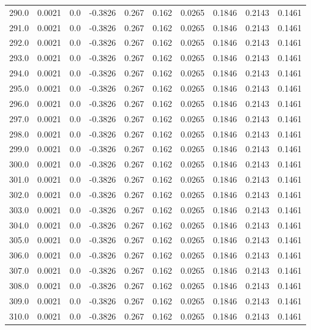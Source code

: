 \begin{longtable}{lrrrrrrrrr}
290.0 & 0.0021 & 0.0 & -0.3826 & 0.267 & 0.162 & 0.0265 & 0.1846 & 0.2143 & 0.1461 \\
291.0 & 0.0021 & 0.0 & -0.3826 & 0.267 & 0.162 & 0.0265 & 0.1846 & 0.2143 & 0.1461 \\
292.0 & 0.0021 & 0.0 & -0.3826 & 0.267 & 0.162 & 0.0265 & 0.1846 & 0.2143 & 0.1461 \\
293.0 & 0.0021 & 0.0 & -0.3826 & 0.267 & 0.162 & 0.0265 & 0.1846 & 0.2143 & 0.1461 \\
294.0 & 0.0021 & 0.0 & -0.3826 & 0.267 & 0.162 & 0.0265 & 0.1846 & 0.2143 & 0.1461 \\
295.0 & 0.0021 & 0.0 & -0.3826 & 0.267 & 0.162 & 0.0265 & 0.1846 & 0.2143 & 0.1461 \\
296.0 & 0.0021 & 0.0 & -0.3826 & 0.267 & 0.162 & 0.0265 & 0.1846 & 0.2143 & 0.1461 \\
297.0 & 0.0021 & 0.0 & -0.3826 & 0.267 & 0.162 & 0.0265 & 0.1846 & 0.2143 & 0.1461 \\
298.0 & 0.0021 & 0.0 & -0.3826 & 0.267 & 0.162 & 0.0265 & 0.1846 & 0.2143 & 0.1461 \\
299.0 & 0.0021 & 0.0 & -0.3826 & 0.267 & 0.162 & 0.0265 & 0.1846 & 0.2143 & 0.1461 \\
300.0 & 0.0021 & 0.0 & -0.3826 & 0.267 & 0.162 & 0.0265 & 0.1846 & 0.2143 & 0.1461 \\
301.0 & 0.0021 & 0.0 & -0.3826 & 0.267 & 0.162 & 0.0265 & 0.1846 & 0.2143 & 0.1461 \\
302.0 & 0.0021 & 0.0 & -0.3826 & 0.267 & 0.162 & 0.0265 & 0.1846 & 0.2143 & 0.1461 \\
303.0 & 0.0021 & 0.0 & -0.3826 & 0.267 & 0.162 & 0.0265 & 0.1846 & 0.2143 & 0.1461 \\
304.0 & 0.0021 & 0.0 & -0.3826 & 0.267 & 0.162 & 0.0265 & 0.1846 & 0.2143 & 0.1461 \\
305.0 & 0.0021 & 0.0 & -0.3826 & 0.267 & 0.162 & 0.0265 & 0.1846 & 0.2143 & 0.1461 \\
306.0 & 0.0021 & 0.0 & -0.3826 & 0.267 & 0.162 & 0.0265 & 0.1846 & 0.2143 & 0.1461 \\
307.0 & 0.0021 & 0.0 & -0.3826 & 0.267 & 0.162 & 0.0265 & 0.1846 & 0.2143 & 0.1461 \\
308.0 & 0.0021 & 0.0 & -0.3826 & 0.267 & 0.162 & 0.0265 & 0.1846 & 0.2143 & 0.1461 \\
309.0 & 0.0021 & 0.0 & -0.3826 & 0.267 & 0.162 & 0.0265 & 0.1846 & 0.2143 & 0.1461 \\
310.0 & 0.0021 & 0.0 & -0.3826 & 0.267 & 0.162 & 0.0265 & 0.1846 & 0.2143 & 0.1461 \\

\end{longtable}
